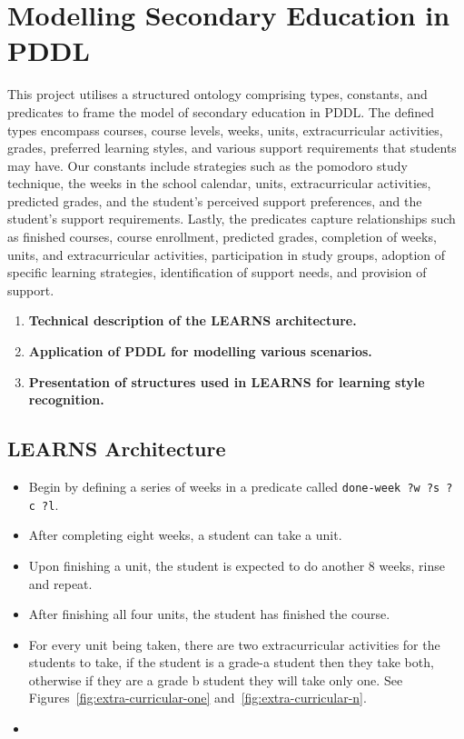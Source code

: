 \section{Modelling Secondary Education in PDDL}
This project utilises a structured ontology comprising types, constants, and predicates to frame the model of secondary education in PDDL\@. The defined types encompass courses, course levels, weeks, units, extracurricular activities, grades, preferred learning styles, and various support requirements that students may have. Our constants include strategies such as the pomodoro study technique, the weeks in the school calendar, units, extracurricular activities, predicted grades, and the student's perceived support preferences, and the student's support requirements. Lastly, the predicates capture relationships such as finished courses, course enrollment, predicted grades, completion of weeks, units, and extracurricular activities, participation in study groups, adoption of specific learning strategies, identification of support needs, and provision of support.
\begin{enumerate}
    \item \textbf{Technical description of the LEARNS architecture.}
    \item \textbf{Application of PDDL for modelling various scenarios.}
    \item \textbf{Presentation of structures used in LEARNS for learning style recognition.}
\end{enumerate}

\subsection{LEARNS Architecture}








\begin{itemize}
    \item Begin by defining a series of weeks in a predicate called \texttt{done-week~?w~?s~?c~?l}.
    \item After completing eight weeks, a student can take a unit.
    \item Upon finishing a unit, the student is expected to do another 8 weeks, rinse and repeat.
    \item After finishing all four units, the student has finished the course.
    \item For every unit being taken, there are two extracurricular activities for the students to take, if the student is a grade-a student then they take both, otherwise if they are a grade b student they will take only one. See Figures~\ref{fig:extra-curricular-one} and~\ref{fig:extra-curricular-n}.
    \item 
\end{itemize}

